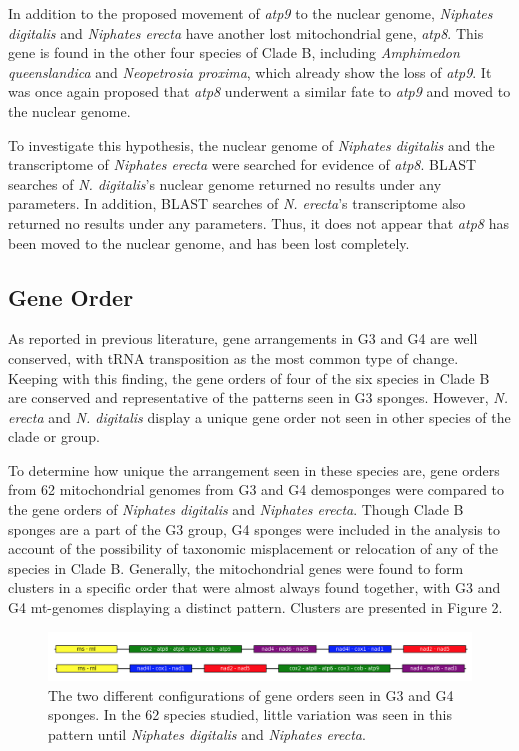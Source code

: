 \documentclass[../main.tex]{subfiles}
\begin{document}
In addition to the proposed movement of \emph{atp9} to the nuclear genome, \emph{Niphates digitalis} and \emph{Niphates erecta} have another lost mitochondrial gene, \emph{atp8}. This gene is found in the other four species of Clade B, including \emph{Amphimedon queenslandica} and \emph{Neopetrosia proxima}, which already show the loss of \emph{atp9}. It was once again proposed that \emph{atp8} underwent a similar fate to \emph{atp9} and moved to the nuclear genome. 

To investigate this hypothesis, the nuclear genome of \emph{Niphates digitalis} and the transcriptome of \emph{Niphates erecta} were searched for evidence of \emph{atp8}. BLAST searches of \emph{N. digitalis}'s nuclear genome returned no results under any parameters. In addition, BLAST searches of \emph{N. erecta}'s transcriptome also returned no results under any parameters. Thus, it does not appear that \emph{atp8} has been moved to the nuclear genome, and has been lost completely.

\subsection{Gene Order}

As reported in previous literature, gene arrangements in  G3 and G4 are well conserved, with tRNA transposition as the most common type of change. Keeping with this finding, the gene orders of four of the six species in Clade B are conserved and representative of the patterns seen in G3 sponges. However, \emph{N. erecta} and \emph{N. digitalis} display a unique gene order not seen in other species of the clade or group.

To determine how unique the arrangement seen in these species are, gene orders from 62 mitochondrial genomes from G3 and G4 demosponges were compared to the gene orders of \emph{Niphates digitalis} and \emph{Niphates erecta}. Though Clade B sponges are a part of the G3 group, G4 sponges were included in the analysis to account of the possibility of taxonomic misplacement or relocation of any of the species in Clade B. Generally, the mitochondrial genes were found to form clusters in a specific order that were almost always found together, with G3 and G4 mt-genomes displaying a distinct pattern. Clusters are presented in Figure 2.

\begin{figure}[htp]
    \centering
    \includegraphics[width=1.0\textwidth]{Figures/figure 2.png}
    \caption{The two different configurations of gene orders seen in G3 and G4 sponges. In the 62 species studied, little variation was seen in this pattern until \emph{Niphates digitalis} and \emph{Niphates erecta}.}
\end{figure}
\end{document}
